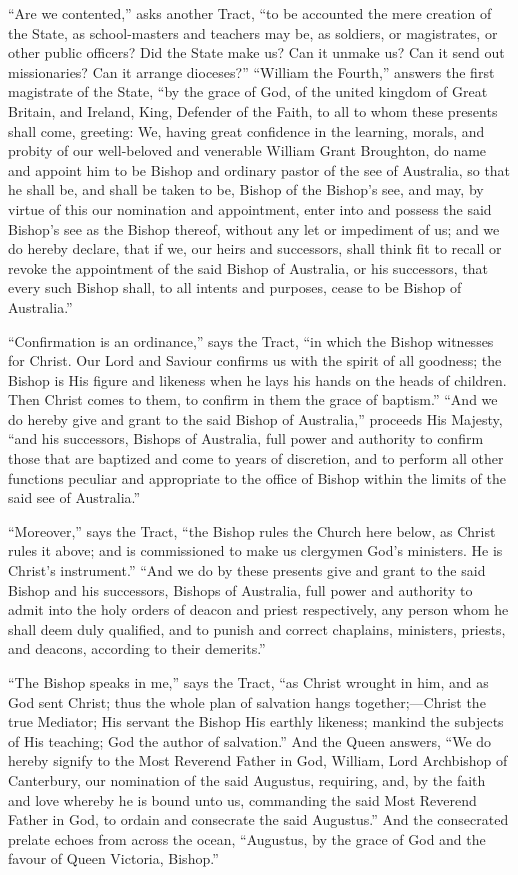``Are we contented,'' asks another Tract, ``to be accounted the mere creation of the State, as school-masters and
teachers may be, as soldiers, or magistrates, or other public
officers? Did the State make us? Can it unmake us? Can it send out
missionaries? Can it arrange dioceses?'' ``William the
Fourth,'' answers the first magistrate of the State, ``by the
grace of God, of the united kingdom of Great Britain, and Ireland,
King, Defender of the Faith, to all to whom these presents shall come,
greeting: We, having great confidence in the learning, morals, and
probity of our well-beloved and venerable William Grant Broughton, do
name and appoint him to be Bishop and ordinary pastor of the see of
Australia, so that he shall be, and shall be taken to be, Bishop of
the Bishop's see, and may, by virtue of this our nomination and
appointment, enter into and possess the said Bishop's see as the
Bishop thereof, without any let or impediment of us; and we do hereby
declare, that if we, our heirs and successors, shall think fit to
recall or revoke the appointment of the said Bishop of Australia, or
his successors, that every such Bishop shall, to all intents and
purposes, cease to be Bishop of Australia.''

``Confirmation is an ordinance,'' says the Tract, ``in
which the Bishop witnesses for Christ. Our Lord and Saviour confirms
us with the spirit of all goodness; the Bishop is His figure and
likeness when he lays his hands on the heads of children. Then Christ
comes to them, to confirm in them the grace of baptism.'' ``And we do hereby give and grant to the said Bishop of
Australia,'' proceeds His Majesty, ``and his successors,
Bishops of Australia, full power and authority to confirm those that
are baptized and come to years of discretion, and to perform all other
functions peculiar and appropriate to the office of Bishop within the
limits of the said see of Australia.''

``Moreover,'' says the Tract, ``the Bishop rules the
Church here below, as Christ rules it above; and is commissioned to
make us clergymen God's ministers. He is Christ's instrument.''
``And we do by these presents give and grant to the said Bishop
and his successors, Bishops of Australia, full power and authority to
admit into the holy orders of deacon and priest respectively, any
person whom he shall deem duly qualified, and to punish and correct
chaplains, ministers, priests, and deacons, according to their
demerits.''

``The Bishop speaks in me,'' says the Tract, ``as
Christ wrought in him, and as God sent Christ; thus the whole plan of
salvation hangs together;—Christ the true Mediator; His servant the
Bishop His earthly likeness; mankind the subjects of His teaching; God
the author of salvation.'' And the Queen answers, ``We do
hereby signify to the Most Reverend Father in God, William, Lord
Archbishop of Canterbury, our nomination of the said Augustus,
requiring, and, by the faith and love whereby he is bound unto us,
commanding the said Most Reverend Father in God, to ordain and
consecrate the said Augustus.'' And the consecrated prelate echoes
from across the ocean, ``Augustus, by the grace of God and the
favour of Queen Victoria, Bishop.''

